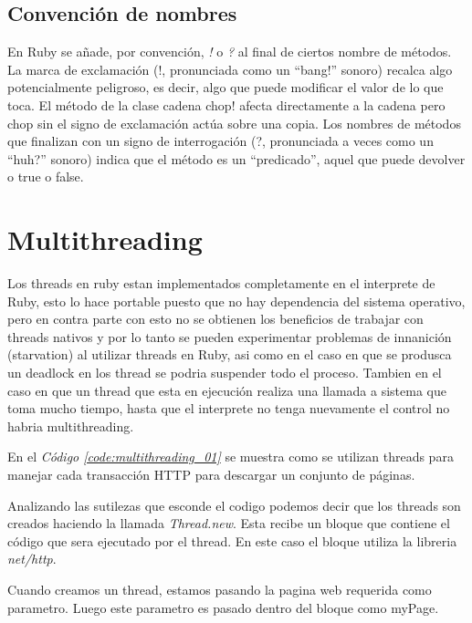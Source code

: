 \documentclass{article}
\newcommand{\refcode}[1]{\textit{Código \ref{#1}}}
\begin{document}
\subsection{Convención de nombres}

En Ruby se añade, por convención, \textit{!} o \textit{?} al final de ciertos nombre de métodos.  La marca de exclamación (!, pronunciada como un “bang!” sonoro)  recalca algo potencialmente peligroso, es decir, algo que puede modificar el valor de lo que toca. El método de la clase cadena chop! afecta directamente a la cadena pero chop sin el signo de exclamación actúa sobre una copia.
Los nombres de métodos que finalizan con un signo de interrogación (?, pronunciada a veces como un “huh?” sonoro) indica que el método es un “predicado”, aquel que puede devolver o true o false.
\bigskip




\section{Multithreading}

	Los threads en ruby estan implementados completamente en el interprete de Ruby, esto lo hace portable puesto que no hay dependencia del sistema operativo, pero en contra parte con esto no se obtienen los beneficios de trabajar con threads nativos y por lo tanto se pueden experimentar problemas de innanición (starvation) al utilizar threads en Ruby, asi como en el caso en que se produsca un deadlock en los thread se podria suspender todo el proceso. Tambien en el caso en que un thread que esta en ejecución realiza una llamada a sistema que toma mucho tiempo, hasta que el interprete no tenga nuevamente el control no habria multithreading.
	\par
	En el \refcode{code:multithreading_01} se muestra como se utilizan threads para manejar cada transacción HTTP para descargar un conjunto de páginas.

 
\bigskip

	Analizando las sutilezas que esconde el codigo podemos decir que los threads son creados haciendo la llamada \textit{Thread.new}. Esta recibe un bloque que contiene el código que sera ejecutado por el thread. En este caso el bloque utiliza la libreria \textit{net/http}.
	\par
	Cuando creamos un thread, estamos pasando la pagina web requerida como parametro. Luego este parametro es pasado dentro del bloque como myPage.
\bigskip
\end{document}
